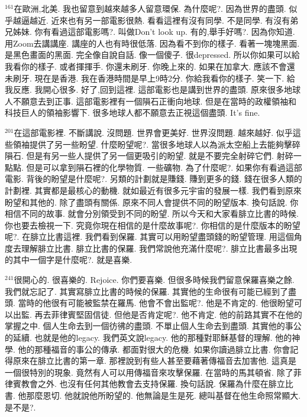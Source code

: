 \documentclass{book}
\begin{document}
$^{161}$在歐洲,北美.
我也留意到越來越多人留意環保.
為什麼呢?.
因為世界的盡頭.
似乎越逼越近.
近來也有另一部電影很熱.
看看這裡有沒有同學.
不是同學.
有沒有弟兄姊妹.
你有看過這部電影嗎?.
叫做Don't look up.
有的,舉手好嗎?.
因為你知道.
用Zoom去講講座.
講座的人也有時很低落.
因為看不到你的樣子.
看著一塊塊黑面.
是黑色畫面的黑面.
完全像自說自話.
像一個傻子.
很depressed.
所以你如果可以給我看你的樣子.
或者揮揮手.
你還未刷牙.
你晚上來的.
如果在加拿大.
應該不會還未刷牙.
現在是香港.
我在香港時間是早上9時2分.
你給我看你的樣子.
笑一下.
給我反應.
我開心很多.
好了,回到這裡.
這部電影也是講到世界的盡頭.
原來很多地球人不願意去到正事.
這部電影裡有一個隕石正衝向地球.
但是在當時的政權領袖和科技巨人的領袖影響下.
很多地球人都不願意去正視這個盡頭.
It's fine.

$^{201}$在這部電影裡.
不斷講說.
沒問題.
世界會更美好.
世界沒問題.
越來越好.
似乎這些領袖提供了另一些盼望.
什麼盼望呢?.
當很多地球人以為派太空船上去能夠擊碎隕石.
但是有另一些人提供了另一個更吸引的盼望.
就是不要完全射碎它們.
射碎一點點.
但是可以拿到隕石裡的化學物質.
一些礦物.
為了什麼呢?.
如果你有看過這部電影.
背後的盼望是什麼呢?.
另類的計劃就是賺錢.
賺到更多的錢.
錢在很多人類的計劃裡.
其實都是最核心的動機.
就如最近有很多元宇宙的發展一樣.
我們看到原來盼望和其他的.
除了盡頭有關係.
原來不同人會提供不同的盼望版本.
換句話說.
你相信不同的故事.
就會分別領受到不同的盼望.
所以今天和大家看腓立比書的時候.
你也要去檢視一下.
究竟你現在相信的是什麼故事呢?.
你相信的是什麼版本的盼望呢?.
在腓立比書這裡.
我們看到保羅.
其實可以用盼望盡頭錢的盼望管理.
用這個角度去理解腓立比書.
腓立比書的保羅.
我們常說他充滿什麼呢?.
腓立比書最多出現的其中一個字是什麼呢?.
就是喜樂.

$^{241}$很開心的.
很喜樂的.
Rejoice.
你們要喜樂.
但很多時候我們留意保羅喜樂之餘.
我們就忘記了.
其實寫腓立比書的時候的保羅.
其實他的生命很有可能已經到了盡頭.
當時的他很有可能被監禁在羅馬.
他會不會出監呢?.
他是不肯定的.
他很盼望可以出監.
再去菲律賓堅固信徒.
但他是否肯定呢?.
他不肯定.
他的前路其實不在他的掌握之中.
個人生命去到一個彷彿的盡頭.
不單止個人生命去到盡頭.
其實他的事公的延續.
也就是他的legacy.
我們英文說legacy.
他的那種對耶穌基督的理解.
他的神學.
他的那種福音的事公的傳承.
都面對很大的危機.
如果你讀過腓立比書.
你會記得原來在腓立比書的第一章.
那裡說到有些人甚至要藉著傳福音去加害他.
這真是一個很特別的現象.
竟然有人可以用傳福音來攻擊保羅.
在當時的馬其頓省.
除了菲律賓教會之外.
也沒有任何其他教會去支持保羅.
換句話說.
保羅為什麼在腓立比書.
他那麼恩切.
他就說他所盼望的.
他無論是生是死.
總叫基督在他生命照常顯大.
是不是?.
\end{document}
